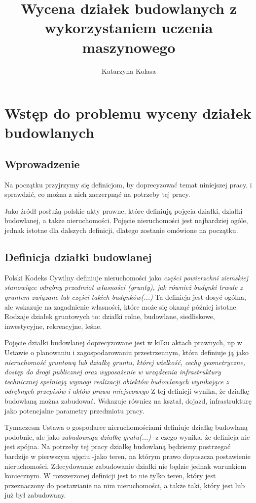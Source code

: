 \documentclass[a4paper,12pt,twoside,openany]{report}
\title{Wycena działek budowlanych z wykorzystaniem uczenia maszynowego}
\author{Katarzyna Kolasa}
\begin{document}
\maketitle

\chapter{Wstęp do problemu wyceny działek budowlanych}

\section{Wprowadzenie}
Na początku przyjrzymy się definicjom, by doprecyzować temat niniejszej pracy, i sprawdzić, co można z nich zaczerpnąć na potrzeby tej pracy.

Jako źródł posłużą polskie akty prawne, które definiują pojęcia działki, działki budowlanej, a także nieruchomości. Pojęcie nieruchomości jest najbardziej ogóle, jednak istotne dla dalszych definicji, dlatego zostanie omówione na początku.


\section{Definicja działki budowlanej}
 Polski Kodeks Cywilny definiuje nieruchomości jako
\textit { części powierzchni ziemskiej stanowiące odrębny przedmiot własności (grunty), jak również budynki trwale z gruntem związane lub części takich budynków(...)} \cite{KC}
Ta definicja jest dosyć ogólna, ale wskazuje na zagadnienie własności, które może się okaząć później istotne.\\
Rodzaje działek gruntowych to: działki rolne, budowlane, siedliskowe, inwestycyjne, rekreacyjne, leśne. 


Pojęcie działki budowlanej doprecyzowane jest w kilku aktach prawnych, np w Ustawie o planowaniu i zagospodarowaniu przestrzennym, która definiuje ją jako \textit {nieruchomość gruntową lub działkę gruntu, której wielkość, cechy geometryczne, dostęp do drogi publicznej oraz wyposażenie w urządzenia infrastruktury technicznej spełniają wymogi realizacji obiektów budowlanych wynikające z odrębnych przepisów i aktów prawa miejscowego}
\cite{Uopizp}
Z tej definicji wynika, że działkę budowlaną można zabudować. Wskazuje równiez na kształ, dojazd, infrastrukturę jako potencjalne parametry przedmiotu pracy.

Tymaczesm Ustawa o gospodarce nieruchomościami  definiuje działkę budowlaną podobnie, ale jako \textit {zabudownąa działkę grutu(...)}\cite{Uogn} -z czego wynika, że definicja nie jest spójna. 
Na potrzeby tej pracy działkę budowlaną będziemy postrzegać bardzije w pierwszym ujęciu -jako teren, na którym prawo dopuszcza postawienie nieruchomości. Zdecydowanie zabudowanie działki nie będzie jednak warunkiem koniecznym. W rozszerzonej definicji jest to nie tylko teren, który jest przeznaczony do postawianie na nim nieruchomości, a także taki, który jest lub już był zabudowany.
\end{document}
